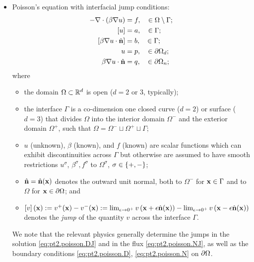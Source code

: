 \begin{itemize}

\item Poisson's equation with interfacial jump conditions:
\begin{subequations} \label{eq:pt2.poisson}
\begin{align}
-\nabla \cdot \left( \beta \nabla u \right) & = f, \quad \in \Omega \setminus \Gamma; \label{eq:pt2.poisson.PDE} \\
\left[ u \right] & = a, \quad \in \Gamma; \label{eq:pt2.poisson.DJ} \\
\left[ \beta \nabla u \cdot \hat{\mathbf{n}} \right] & = b, \quad \in \Gamma; \label{eq:pt2.poisson.NJ} \\
u & = p, \quad \in \partial\Omega_d; \label{eq:pt2.poisson.D} \\
\beta \nabla u \cdot \hat{\mathbf{n}} & = q, \quad \in \partial\Omega_n; \label{eq:pt2.poisson.N}
\end{align}
\end{subequations}
where
\begin{itemize}
\item the domain $\Omega \subset \mathbb{R}^d$ is open ($d = 2 \text{ or } 3$, typically);
\item the interface $\Gamma$ is a co-dimension one closed curve ($d = 2$) or surface ($d = 3$) that divides $\Omega$ into the interior domain $\Omega^-$ and the exterior domain $\Omega^+$, such that $\Omega = \Omega^- \sqcup \Omega^+ \sqcup \Gamma$;
\item $u$ (unknown), $\beta$ (known), and $f$ (known) are scalar functions which can exhibit discontinuities across $\Gamma$ but otherwise are assumed to have smooth restrictions $u^{\sigma}$, $\beta^{\sigma}, f^{\sigma}$ to $\Omega^{\sigma}$, $\sigma \in \left\lbrace +,- \right\rbrace$;
\item $\hat{\mathbf{n}} = \hat{\mathbf{n}}(\mathbf{x})$ denotes the outward unit normal, both to $\Omega^-$ for $\mathbf{x} \in \Gamma$ and to $\Omega$ for $\mathbf{x} \in \partial\Omega$; and
\item $\left[ v \right](\mathbf{x}) := v^+(\mathbf{x}) - v^-(\mathbf{x}) := \lim_{\epsilon \to 0^+} v\left( \mathbf{x} + \epsilon \hat{\mathbf{n}}(\mathbf{x}) \right) - \lim_{\epsilon \to 0^+} v\left( \mathbf{x} - \epsilon \hat{\mathbf{n}}(\mathbf{x}) \right)$ denotes the \emph{jump} of the quantity $v$ across the interface $\Gamma$.
\end{itemize}
We note that the relevant physics generally determine the jumps in the solution \eqref{eq:pt2.poisson.DJ} and in the flux \eqref{eq:pt2.poisson.NJ}, as well as the boundary conditions \eqref{eq:pt2.poisson.D}, \eqref{eq:pt2.poisson.N} on $\partial\Omega$.


\end{itemize}
